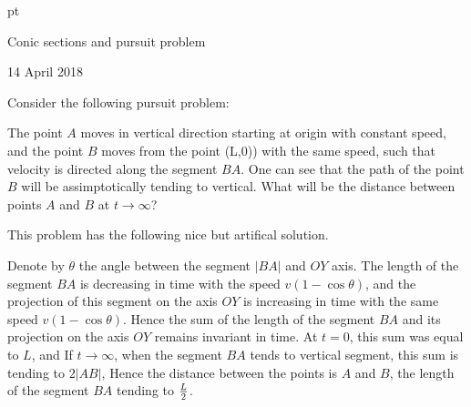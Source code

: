     pt

\def\V {{\cal V}}
\def\s {{\sigma}}
\def\Q {{\bf Q}}
\def\D {{\cal D}}
\def\G {{\Gamma}}
\def\C {{\bf C}}
\def\M {{\cal M}}
\def\Z {{\bf Z}}
\def\U  {{\cal U}}
\def\H {{\cal H}}
\def\R  {{\bf R}}
\def\l {\lambda}
\def\p {\partial}
\def\r {{\bf r}}
\def\v {{\bf v}}
\def\n {{\bf n}}
\def\t {{\bf t}}
\def\b {{\bf b}}
\def\ac {{\bf a}}
\def \X   {{\bf X}}
\def \Y   {{\bf Y}}
\def \E   {{\bf E}}
\def\vare {\varepsilon}
\def\A {{\bf A}}
\def\t {\tilde}
\def\a {\alpha}
\def\K {{\bf K}}
\def\N {{\bf N}}
\def\V {{\cal V}}
\def\s {{\sigma}}
\def\S {{\Sigma}}
\def\s {{\sigma}}
\def\p{\partial}
\def\vare{{\varepsilon}}
\def\Q {{\bf Q}}
\def\D {{\cal D}}
\def\G {{\Gamma}}
\def\C {{\bf C}}
\def\M {{\cal M}}
\def\Z {{\bf Z}}
\def\U  {{\cal U}}
\def\H {{\cal H}}
\def\R  {{\bf R}}
\def\E  {{\bf E}}
\def\l {\lambda}
\def\degree {{\bf {\rm degree}\,\,}}
\def \finish {${\,\,\vrule height1mm depth2mm width 8pt}$}
\def \m {\medskip}
\def\p {\partial}
\def\r {{\bf r}}
\def\v {{\bf v}}
\def\n {{\bf n}}
\def\t {{\bf t}}
\def\b {{\bf b}}
\def\c {{\bf c}}
\def\e{{\bf e}}
\def\f{{\bf f}}
\def\g{{\bf g}}
\def \X   {{\bf X}}
\def \Y   {{\bf Y}}
\def \x   {{\bf x}}
\def \y   {{\bf y}}
\def\w {{\omega}}
\def\A{{\bf A}}
\def\B{{\bf B}}
\def\pt{{\bf p}}


\centerline {Conic sections and pursuit problem}

14 April 2018

 Consider the following pursuit problem:

   The point $A$ moves in vertical direction
     starting at origin with constant speed,
  and the point   $B$
   moves from the point
    (L,0)) with the same speed, 
   such that velocity
  is directed along the segment $BA$. 
  One can see that the path of the point
  $B$ will be assimptotically tending to vertical. 
      What will be the distance between
points $A$ and $B$ at $t\to \infty$?


  This problem has the following nice but artifical 
solution.

Denote by $\theta$ the angle between
the segment $|BA|$ and $OY$ axis.
The length of the segment  $BA$ 
is decreasing in time with the 
speed $v(1-\cos\theta)$,  
and the projection of
this segment on the axis $OY$ is increasing in time with
the same speed $v(1-\cos\theta)$. Hence the
sum of the length  of the segment $BA$ and its projection
on the axis $OY$ remains invariant in time.
At $t=0$, this sum was equal to $L$, and
  If $t\to \infty$, when  the segment $BA$ tends to
vertical segment, this sum is tending
to $2|AB|$,  Hence the distance between the points
is $A$ and $B$, the length of the segment
$BA$  tending to $L\over 2$. 
      
